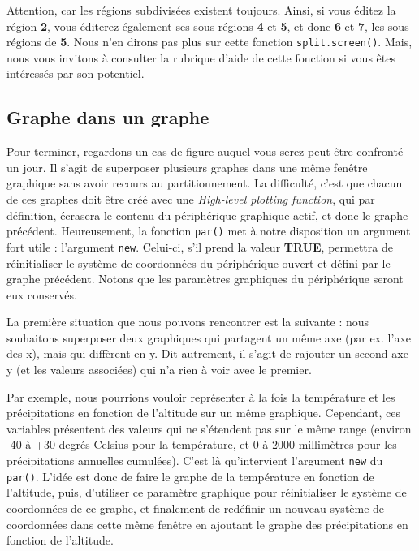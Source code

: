 \documentclass[]{article}
\begin{document}
Attention, car les régions subdivisées existent toujours. Ainsi, si vous éditez
la région \textbf{2}, vous éditerez également ses sous-régions \textbf{4} et \textbf{5}, et
donc \textbf{6} et \textbf{7}, les sous-régions de \textbf{5}. Nous n'en dirons pas plus sur
cette fonction \texttt{split.screen()}. Mais, nous vous invitons à consulter la
rubrique d'aide de cette fonction si vous êtes intéressés par son potentiel.

\hypertarget{graphe-dans-un-graphe}{%
\subsection{Graphe dans un graphe}\label{graphe-dans-un-graphe}}

Pour terminer, regardons un cas de figure auquel vous serez peut-être confronté
un jour. Il s'agit de superposer plusieurs graphes dans une même fenêtre
graphique sans avoir recours au partitionnement. La difficulté, c'est que chacun
de ces graphes doit être créé avec une \emph{High-level plotting function}, qui par
définition, écrasera le contenu du périphérique graphique actif, et donc le
graphe précédent. Heureusement, la fonction \texttt{par()} met à notre disposition un
argument fort utile : l'argument \texttt{new}. Celui-ci, s'il prend la valeur \textbf{TRUE},
permettra de réinitialiser le système de coordonnées du périphérique ouvert et
défini par le graphe précédent. Notons que les paramètres graphiques du
périphérique seront eux conservés.

La première situation que nous pouvons rencontrer est la suivante : nous
souhaitons superposer deux graphiques qui partagent un même axe (par ex. l'axe
des x), mais qui diffèrent en y. Dit autrement, il s'agit de rajouter un second
axe y (et les valeurs associées) qui n'a rien à voir avec le premier.

Par exemple, nous pourrions vouloir représenter à la fois la température et les
précipitations en fonction de l'altitude sur un même graphique. Cependant, ces
variables présentent des valeurs qui ne s'étendent pas sur le même range
(environ -40 à +30 degrés Celsius pour la température, et 0 à 2000 millimètres
pour les précipitations annuelles cumulées). C'est là qu'intervient l'argument
\texttt{new} du \texttt{par()}. L'idée est donc de faire le graphe de la température en
fonction de l'altitude, puis, d'utiliser ce paramètre graphique pour
réinitialiser le système de coordonnées de ce graphe, et finalement de redéfinir
un nouveau système de coordonnées dans cette même fenêtre en ajoutant le graphe
des précipitations en fonction de l'altitude.
\end{document}
